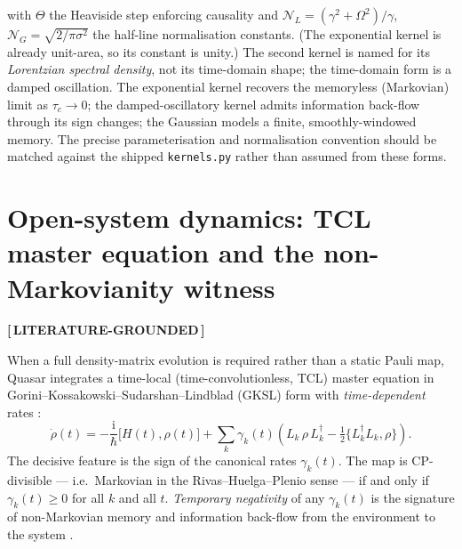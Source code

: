 \documentclass[11pt]{article}
\newcommand{\statusVerified}{\textbf{\color{verified}[\,LITERATURE-GROUNDED\,]}}
\newcommand{\ii}{\mathrm{i}}
\begin{document}
with $\Theta$ the Heaviside step enforcing causality and
$\mathcal{N}_{\!L}=(\gamma^2+\Omega^2)/\gamma$, $\mathcal{N}_{\!G}=\sqrt{2/\pi\sigma^2}$ the
half-line normalisation constants. (The exponential kernel is already unit-area, so its
constant is unity.) The second kernel is named for its \emph{Lorentzian spectral density}, not
its time-domain shape; the time-domain form is a damped oscillation. The exponential kernel
recovers the memoryless (Markovian) limit as $\tau_c\!\to\!0$; the damped-oscillatory kernel
admits information back-flow through its sign changes; the Gaussian models a finite,
smoothly-windowed memory. The precise parameterisation and normalisation convention should be
matched against the shipped \texttt{kernels.py} rather than assumed from these forms.

\section{Open-system dynamics: TCL master equation and the non-Markovianity witness}
\statusVerified

When a full density-matrix evolution is required rather than a static Pauli map, Quasar
integrates a time-local (time-convolutionless, TCL) master equation in
Gorini--Kossakowski--Sudarshan--Lindblad (GKSL) form with \emph{time-dependent} rates
\cite{lindblad1976,gks1976,breuerbook}:
\begin{equation}
\boxed{\;\dot\rho(t)=-\frac{\ii}{\hbar}\big[H(t),\rho(t)\big]
+\sum_k \gamma_k(t)\!\left(L_k\,\rho\,L_k^{\dagger}
-\tfrac{1}{2}\big\{L_k^{\dagger}L_k,\rho\big\}\right).\;}
\end{equation}
The decisive feature is the sign of the canonical rates $\gamma_k(t)$. The map is
CP-divisible --- i.e.\ Markovian in the Rivas--Huelga--Plenio sense --- if and only if
$\gamma_k(t)\ge 0$ for all $k$ and all $t$. \emph{Temporary negativity} of any
$\gamma_k(t)$ is the signature of non-Markovian memory and information back-flow from the
environment to the system \cite{rhp2010,rhp2014}.
\end{document}
